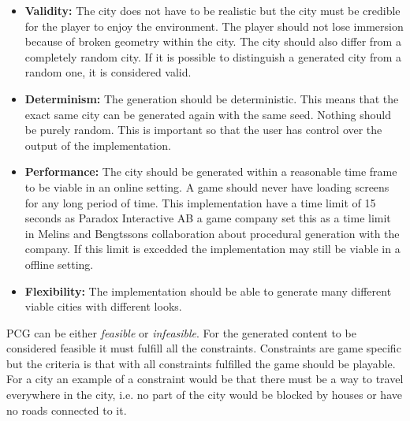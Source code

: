 \begin{itemize}
	\item \textbf{Validity:} The city does not have to be realistic but the city must be credible for the player to enjoy the environment. The player should not lose immersion because of broken geometry within the city. The city should also differ from a completely random city. If it is possible to distinguish a generated city from a random one, it is considered valid.
		
	\item \textbf{Determinism:} The generation should be deterministic. This means that the exact same city can be generated again with the same seed. Nothing should be purely random. This is important so that the user has control over the output of the implementation.
		
	\item \textbf{Performance:} The city should be generated within a reasonable time frame to be viable in an online setting. A game should never have loading screens for any long period of time. This implementation have a time limit of 15 seconds as Paradox Interactive AB a game company set this as a time limit in Melins and Bengtssons collaboration about procedural generation with the company\cite{FloorPlanPCG}.  If this limit is excedded the implementation may still be viable in a offline setting.
		
	\item \textbf{Flexibility: } The implementation should be able to generate many different viable cities with different looks.
\end{itemize} 

PCG can be either \textit{feasible} or \textit{infeasible}. For the generated content to be considered feasible it must fulfill all the constraints\cite{NoveltySearch}. Constraints are game specific but the criteria is that with all constraints fulfilled the game should be playable. For a city an example of a constraint would be that there must be a way to travel everywhere in the city, i.e. no part of the city would be blocked by houses or have no roads connected to it.